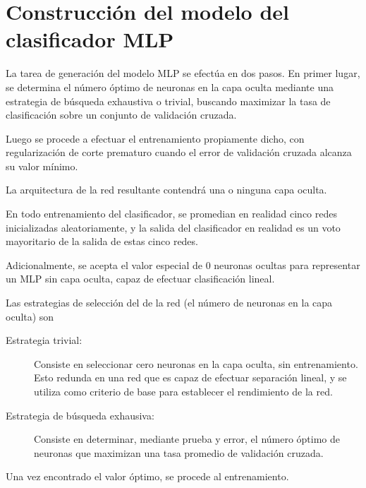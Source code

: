 %
%
%
\section{Construcción del modelo del clasificador MLP}
%
La tarea de generación del modelo MLP se efectúa en dos pasos.  En
primer lugar, se determina el número óptimo de neuronas en la capa
oculta mediante una estrategia de búsqueda exhaustiva o trivial,
buscando maximizar la tasa de clasificación sobre un conjunto de
validación cruzada.

Luego se procede a efectuar el entrenamiento propiamente dicho, con
regularización de corte prematuro cuando el error de validación
cruzada alcanza su valor mínimo.

La arquitectura de la red resultante contendrá una o ninguna capa
oculta.

En todo entrenamiento del clasificador, se promedian en realidad cinco
redes inicializadas aleatoriamente, y la salida del clasificador en
realidad es un voto mayoritario de la salida de estas cinco redes.

Adicionalmente, se acepta el valor especial de 0 neuronas ocultas para
representar un MLP sin capa oculta, capaz de efectuar clasificación lineal.

Las estrategias de selección del \hparam{} de la red (el número de
neuronas en la capa oculta) son
%
\begin{description}
\item[Estrategia trivial:] Consiste en seleccionar cero neuronas
  en la capa oculta, sin entrenamiento. Esto redunda en una red que es
  capaz de efectuar separación lineal, y se utiliza como criterio de base para
  establecer el rendimiento de la red.
\item[Estrategia de búsqueda exhausiva:] Consiste en determinar, mediante prueba y error,
  el número óptimo de neuronas que maximizan una tasa promedio de validación cruzada.
\end{description}
%
Una vez encontrado el valor óptimo, se procede al entrenamiento.
